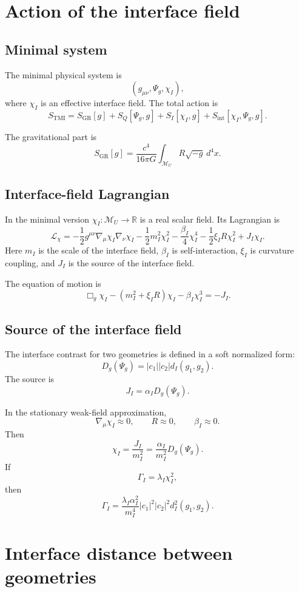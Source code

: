 \documentclass[12pt,a4paper]{article}
\newcommand{\M}{\mathcal M_U}
\newcommand{\Lag}{\mathcal L}
\begin{document}
\section{Action of the interface field}

\subsection{Minimal system}

The minimal physical system is
\[
(g_{\mu\nu},\Psi_g,\chi_I),
\]
where \(\chi_I\) is an effective interface field. The total action is
\[
S_{\mathrm{TMI}}
=
S_{\mathrm{GR}}[g]
+
S_Q[\Psi_g,g]
+
S_I[\chi_I,g]
+
S_{\mathrm{int}}[\chi_I,\Psi_g,g].
\]

The gravitational part is
\[
S_{\mathrm{GR}}[g]
=
\frac{c^4}{16\pi G}
\int_{\M}R\sqrt{-g}\,d^4x.
\]

\subsection{Interface-field Lagrangian}

In the minimal version \(\chi_I:\M\to\mathbb R\) is a real scalar field. Its Lagrangian is
\[
\Lag_\chi
=
-
\frac12g^{\mu\nu}\nabla_\mu\chi_I\nabla_\nu\chi_I
-
\frac12m_I^2\chi_I^2
-
\frac{\beta_I}{4}\chi_I^4
-
\frac12\xi_I R\chi_I^2
+
J_I\chi_I.
\]
Here \(m_I\) is the scale of the interface field, \(\beta_I\) is self-interaction, \(\xi_I\) is curvature coupling, and \(J_I\) is the source of the interface field.

The equation of motion is
\[
\boxed{
\Box_g\chi_I
-
(m_I^2+\xi_I R)\chi_I
-
\beta_I\chi_I^3
=
-J_I.
}
\]

\subsection{Source of the interface field}

The interface contrast for two geometries is defined in a soft normalized form:
\[
D_g(\Psi_g)=|c_1||c_2|d_I(g_1,g_2).
\]
The source is
\[
J_I=\alpha_I D_g(\Psi_g).
\]

In the stationary weak-field approximation,
\[
\nabla_\mu\chi_I\approx0,
\qquad
R\approx0,
\qquad
\beta_I\approx0.
\]
Then
\[
\chi_I=\frac{J_I}{m_I^2}=\frac{\alpha_I}{m_I^2}D_g(\Psi_g).
\]
If
\[
\Gamma_I=\lambda_I\chi_I^2,
\]
then
\[
\boxed{
\Gamma_I
=
\frac{\lambda_I\alpha_I^2}{m_I^4}
|c_1|^2|c_2|^2d_I^2(g_1,g_2).
}
\]

\section{Interface distance between geometries}
\end{document}
